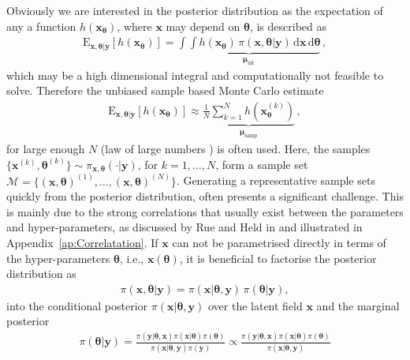 Obviously we are interested in the posterior distribution as the expectation of any a function $h(\bm{x}_{\bm{\theta}})$, where $\bm{x}$ may depend on $\bm{\theta}$, is described as 
\begin{align}
	\text{E}_{\bm{x},\bm{\theta}|\bm{y}} [h(\bm{x}_{\bm{\theta}})] =  \underbrace{\int \int   h(\bm{x}_{\bm{\theta}}) \,  \pi(\bm{x}, \bm{\theta} | \bm{y} ) \, \text{d} \bm{x}  \, \text{d} \bm{\theta}}_{\bm{\mu}_{\text{int}}}   \label{eq:expPos} \, ,
\end{align}
which may be a high dimensional integral and computationally not feasible to solve.
Therefore the unbiased sample based Monte Carlo estimate \cite{roberts2004general}
\begin{align}
	\label{eq:sampMean}
	\text{E}_{\bm{x},\bm{\theta}|\bm{y}} [h(\bm{x}_{\bm{\theta}})] \approx \underbrace{ \frac{1}{N} \sum_{k=1}^{N} h(\bm{x}^{(k)}_{\bm{\theta}})  }_{\bm{\mu}_{\text{samp}}} \, ,
\end{align}
for large enough $N$ (law of large numbers \cite[Chapter 17]{tweedie2009measprob}) is often used.
Here, the samples $\{\bm{x}^{(k)},\bm{\theta}^{(k)} \}\sim \pi_{\bm{x}, \bm{\theta}}(\cdot|\bm{y})$, for $k = 1, \dots, N$, form a sample set $\mathcal{M} =\{ (\bm{x},\bm{\theta})^{(1)}, \dots ,  (\bm{x},\bm{\theta})^{(N)} \}$.
Generating a representative sample sets quickly from the posterior distribution, often presents a significant challenge. This is mainly due to the strong correlations that usually exist between the parameters and hyper-parameters, as discussed by Rue and Held in \cite{rue2005gaussian} and illustrated in Appendix~\ref{ap:Correlatation}.
If $\bm{x}$ can not be parametrised directly in terms of the hyper-parameters $\bm{\theta}$, i.e., $\bm{x}(\bm{\theta})$, it is beneficial to factorise the posterior distribution as
\begin{align}
	\pi(\bm{x}, \bm{\theta} |  \bm{y}) = \pi(\bm{x} |  \bm{\theta}, \bm{y}) \, \pi(\bm{\theta} |   \bm{y}), \label{eq:MTC}
\end{align}
into the conditional posterior $\pi(\bm{x} |  \bm{\theta}, \bm{y})$ over the latent field $\bm{x}$ and the marginal posterior 
\begin{align}
	\pi(\bm{\theta} |   \bm{y}) =  \frac{ \pi(   \bm{y} | \bm{\theta} ,\bm{x})  \pi( \bm{x} | \bm{\theta} )  \pi(\bm{\theta}) }{ \pi(\bm{x} | \bm{\theta} ,   \bm{y})   \pi( \bm{y})} \propto \frac{ \pi(   \bm{y} | \bm{\theta} ,\bm{x})  \pi( \bm{x} | \bm{\theta} )  \pi(\bm{\theta}) }{ \pi(\bm{x} | \bm{\theta} ,   \bm{y}) }
\end{align}
